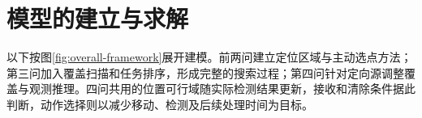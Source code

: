 \section{模型的建立与求解}\label{sec:models}


以下按图\ref{fig:overall-framework}展开建模。前两问建立定位区域与主动选点方法；第三问加入覆盖扫描和任务排序，形成完整的搜索过程；第四问针对定向源调整覆盖与观测推理。四问共用的位置可行域随实际检测结果更新，接收和清除条件据此判断，动作选择则以减少移动、检测及后续处理时间为目标。

%
%
%
%
